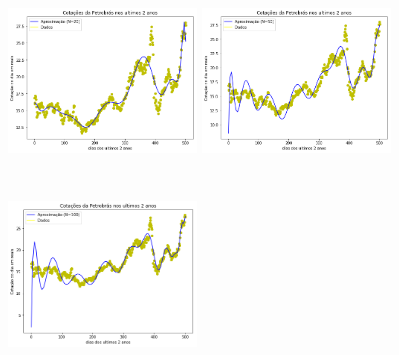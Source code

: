 \documentclass{article}
\begin{document}
\begin{figure}[!htb]
\includegraphics [width=5cm,height=5cm]{Gauss/G20.png}
\includegraphics [width=5cm,height=5cm]{Gauss/G50.png}
\includegraphics [width=5cm,height=5cm]{Gauss/G100.png}
\end{figure}


\newpage
\end{document}
